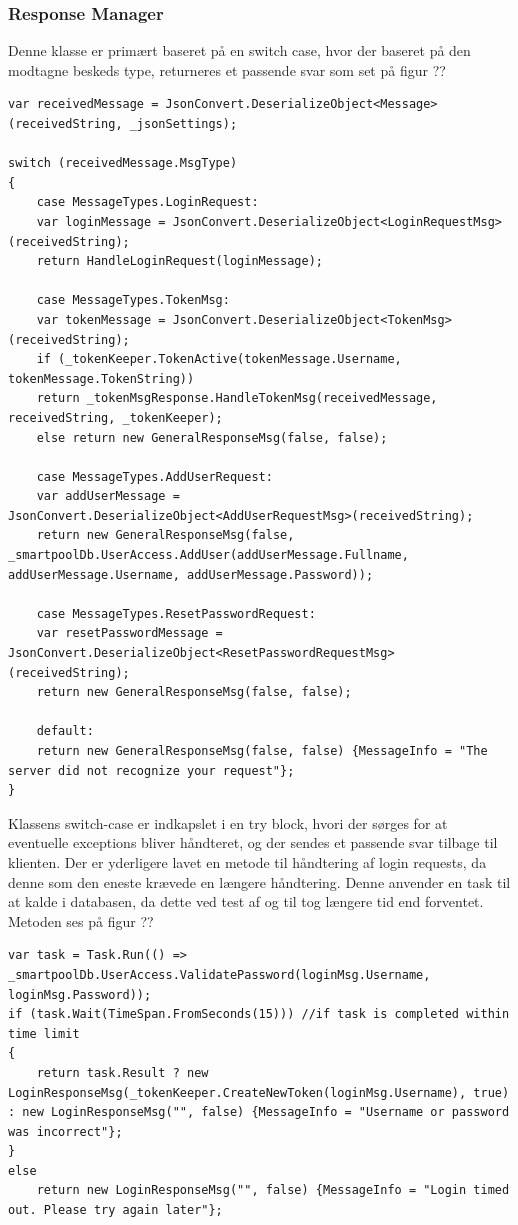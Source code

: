 \subsubsection{Response Manager}
Denne klasse er primært baseret på en switch case, hvor der baseret på den modtagne beskeds type, returneres et passende svar som set på figur ??
\begin{lstlisting}[caption=Server.ResponseManager, label=code:Server.ResponseManager]
var receivedMessage = JsonConvert.DeserializeObject<Message>(receivedString, _jsonSettings);

switch (receivedMessage.MsgType)
{
	case MessageTypes.LoginRequest:
	var loginMessage = JsonConvert.DeserializeObject<LoginRequestMsg>(receivedString);
	return HandleLoginRequest(loginMessage);
	
	case MessageTypes.TokenMsg:
	var tokenMessage = JsonConvert.DeserializeObject<TokenMsg>(receivedString);
	if (_tokenKeeper.TokenActive(tokenMessage.Username, tokenMessage.TokenString))
	return _tokenMsgResponse.HandleTokenMsg(receivedMessage, receivedString, _tokenKeeper);
	else return new GeneralResponseMsg(false, false);
	
	case MessageTypes.AddUserRequest:
	var addUserMessage = JsonConvert.DeserializeObject<AddUserRequestMsg>(receivedString);
	return new GeneralResponseMsg(false, _smartpoolDb.UserAccess.AddUser(addUserMessage.Fullname, addUserMessage.Username, addUserMessage.Password));

	case MessageTypes.ResetPasswordRequest:
	var resetPasswordMessage = JsonConvert.DeserializeObject<ResetPasswordRequestMsg>(receivedString);
	return new GeneralResponseMsg(false, false);
	
	default:
	return new GeneralResponseMsg(false, false)	{MessageInfo = "The server did not recognize your request"};
}
\end{lstlisting}

Klassens switch-case er indkapslet i en try block, hvori der sørges for at eventuelle exceptions bliver håndteret, og der sendes et passende svar tilbage til klienten. Der er yderligere lavet en metode til håndtering af login requests, da denne som den eneste krævede en længere håndtering. Denne anvender en task til at kalde i databasen, da dette ved test af og til tog længere tid end forventet. Metoden ses på figur ??

\begin{lstlisting}[caption=Server.ResponseManager.HandleLoginRequest, label=code:Server.ResponseManager.HandleLoginRequest]
var task = Task.Run(() => _smartpoolDb.UserAccess.ValidatePassword(loginMsg.Username, loginMsg.Password));
if (task.Wait(TimeSpan.FromSeconds(15))) //if task is completed within time limit
{
	return task.Result ? new LoginResponseMsg(_tokenKeeper.CreateNewToken(loginMsg.Username), true) : new LoginResponseMsg("", false) {MessageInfo = "Username or password was incorrect"};
}
else
	return new LoginResponseMsg("", false) {MessageInfo = "Login timed out. Please try again later"};
\end{lstlisting}

